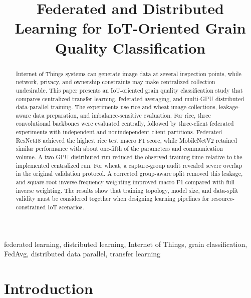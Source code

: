\documentclass[conference]{IEEEtran}
\begin{document}
\title{Federated and Distributed Learning for IoT-Oriented Grain Quality Classification}

\author{
}

\maketitle

\begin{abstract}
Internet of Things systems can generate image data at several inspection points, while network, privacy, and ownership constraints may make centralized collection undesirable. This paper presents an IoT-oriented grain quality classification study that compares centralized transfer learning, federated averaging, and multi-GPU distributed data-parallel training. The experiments use rice and wheat image collections, leakage-aware data preparation, and imbalance-sensitive evaluation. For rice, three convolutional backbones were evaluated centrally, followed by three-client federated experiments with independent and nonindependent client partitions. Federated ResNet18 achieved the highest rice test macro F1 score, while MobileNetV2 retained similar performance with about one-fifth of the parameters and communication volume. A two-GPU distributed run reduced the observed training time relative to the implemented centralized run. For wheat, a capture-group audit revealed severe overlap in the original validation protocol. A corrected group-aware split removed this leakage, and square-root inverse-frequency weighting improved macro F1 compared with full inverse weighting. The results show that training topology, model size, and data-split validity must be considered together when designing learning pipelines for resource-constrained IoT scenarios.
\end{abstract}

\begin{IEEEkeywords}
federated learning, distributed learning, Internet of Things, grain classification, FedAvg, distributed data parallel, transfer learning
\end{IEEEkeywords}

\section{Introduction}
\end{document}
